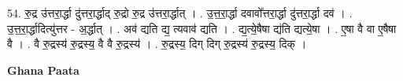 \documentclass[17pt]{extarticle}
\begin{document}
54. रु॒द्र उ॑त्तरा॒र्द्धा दु॑त्तरा॒र्द्धाद् रु॒द्रो रु॒द्र उ॑त्तरा॒र्द्धात् । . उ॒त्त॒रा॒र्द्धा दवावो᳚त्तरा॒र्द्धा दु॑त्तरा॒र्द्धा दव॑ । . उ॒त्त॒रा॒र्द्धादित्यु॑त्तर - अ॒र्द्धात् । . अव॑ द्यति द्य॒ त्यवाव॑ द्यति । . द्य॒त्ये॒षैषा द्य॑ति द्यत्ये॒षा । . ए॒षा वै वा ए॒षैषा वै । . वै रु॒द्रस्य॑ रु॒द्रस्य॒ वै वै रु॒द्रस्य॑ । . रु॒द्रस्य॒ दिग् दिग् रु॒द्रस्य॑ रु॒द्रस्य॒ दिक् । \newline

\textbf{Ghana Paata } \newline
\end{document}
